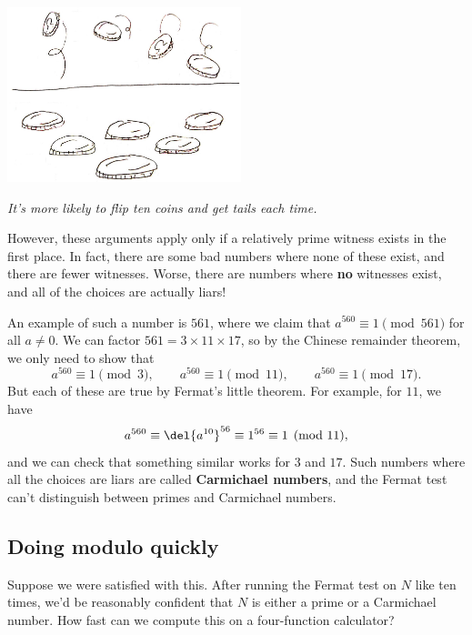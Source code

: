 \documentclass[11pt,paper=letter]{scrartcl}
\begin{document}
\begin{center}
  \includegraphics[height=2in]{3.jpg}

  \emph{\footnotesize It's more likely to flip ten coins and get tails each time.}
\end{center}

However, these arguments apply only if a relatively prime witness exists in the first place. In fact, there are some bad numbers where none of these exist, and there are fewer witnesses. Worse, there are numbers where \textbf{no} witnesses exist, and all of the choices are actually liars!

An example of such a number is $561$, where we claim that $a^{560} \equiv 1 \pmod{561}$ for all $a \neq 0$. We can factor $561 = 3 \times 11 \times 17$, so by the Chinese remainder theorem, we only need to show that
$$a^{560} \equiv 1 \pmod{3}, \qquad a^{560} \equiv 1 \pmod{11}, \qquad a^{560} \equiv 1 \pmod{17}.$$
But each of these are true by Fermat's little theorem. For example, for $11$, we have
$$a^{560} \equiv \del{a^{10}}^{56} \equiv 1^{56} \equiv 1 \pmod{11},$$
and we can check that something similar works for $3$ and $17$. Such numbers where all the choices are liars are called \textbf{Carmichael numbers}, and the Fermat test can't distinguish between primes and Carmichael numbers.

\subsection{Doing modulo quickly}

Suppose we were satisfied with this. After running the Fermat test on $N$ like ten times, we'd be reasonably confident that $N$ is either a prime or a Carmichael number. How fast can we compute this on a four-function calculator?
\end{document}
